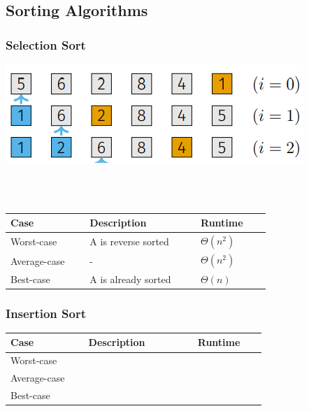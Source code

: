 \subsection{Sorting Algorithms}
    \subsubsection{Selection Sort}
        \begin{minipage}{0.59\linewidth}
            \includegraphics[width = \linewidth]{src/6_algorithms/images/selection_sort.png}
        \end{minipage}
        \begin{minipage}{0.39\linewidth}
            \\
            \\
        \end{minipage}

        
        
        \begin{tabular*}{\linewidth}{| p{0.25\linewidth} | p{0.35\linewidth} | p{0.22\linewidth} |}
            \hline
            Case & Description & Runtime\\
            \hline \hline
            Worst-case & A is reverse sorted & $\Theta(n^2)$ \\
            \hline
            Average-case & - & $\Theta(n^2)$ \\
            \hline
            Best-case & A is already sorted & $\Theta(n)$ \\
            \hline
        \end{tabular*}
        
    \subsubsection{Insertion Sort}
        \begin{tabular*}{\linewidth}{| p{0.25\linewidth} | p{0.35\linewidth} | p{0.22\linewidth} |}
            \hline
            Case & Description & Runtime\\
            \hline \hline
            Worst-case &  &  \\
            \hline
            Average-case &  &  \\
            \hline
            Best-case &  &  \\
            \hline
        \end{tabular*}

